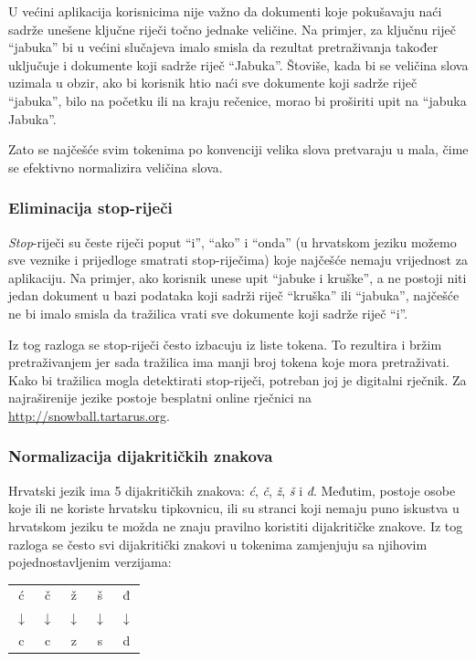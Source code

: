 \documentclass[a4paper,twoside,12pt]{scrreprt}
\newenvironment{nscenter}
 {\par\nopagebreak\centering}
 {\parskip=0pt\par\noindent\ignorespacesafterend}
\begin{document}
U većini aplikacija korisnicima nije važno da dokumenti koje pokušavaju naći sadrže unešene ključne riječi točno jednake veličine. Na primjer, za ključnu riječ ``jabuka'' bi u većini slučajeva imalo smisla da rezultat pretraživanja također uključuje i dokumente koji sadrže riječ ``Jabuka''. Štoviše, kada bi se veličina slova uzimala u obzir, ako bi korisnik htio naći sve dokumente koji sadrže riječ ``jabuka'', bilo na početku ili na kraju rečenice, morao bi proširiti upit na ``jabuka Jabuka''.

Zato se najčešće svim tokenima po konvenciji velika slova pretvaraju u mala, čime se efektivno normalizira veličina slova.

\subsubsection{Eliminacija stop-riječi}

\textit{Stop}-riječi su česte riječi poput ``i'', ``ako'' i ``onda'' (u hrvatskom jeziku možemo sve veznike i prijedloge smatrati stop-riječima) koje najčešće nemaju vrijednost za aplikaciju. Na primjer, ako korisnik unese upit ``jabuke i kruške'', a ne postoji niti jedan dokument u bazi podataka koji sadrži riječ ``kruška'' ili ``jabuka'', najčešće ne bi imalo smisla da tražilica vrati sve dokumente koji sadrže riječ ``i''.

Iz tog razloga se stop-riječi često izbacuju iz liste tokena. To rezultira i bržim pretraživanjem jer sada tražilica ima manji broj tokena koje mora pretraživati. Kako bi tražilica mogla detektirati stop-riječi, potreban joj je digitalni rječnik. Za najraširenije jezike postoje besplatni online rječnici na \url{http://snowball.tartarus.org}.

\subsubsection{Normalizacija dijakritičkih znakova}

Hrvatski jezik ima 5 dijakritičkih znakova: \textit{ć}, \textit{č}, \textit{ž}, \textit{š} i \textit{đ}. Međutim, postoje osobe koje ili ne koriste hrvatsku tipkovnicu, ili su stranci koji nemaju puno iskustva u hrvatskom jeziku te možda ne znaju pravilno koristiti dijakritičke znakove. Iz tog razloga se često svi dijakritički znakovi u tokenima zamjenjuju sa njihovim pojednostavljenim verzijama:

\begin{nscenter}
  \begin{tabular}{ccccc}
    ć            & č            & ž            & š            & đ            \\
    $\downarrow$ & $\downarrow$ & $\downarrow$ & $\downarrow$ & $\downarrow$ \\
    c            & c            & z            & s            & d            \\
  \end{tabular}
\end{nscenter}
\end{document}
